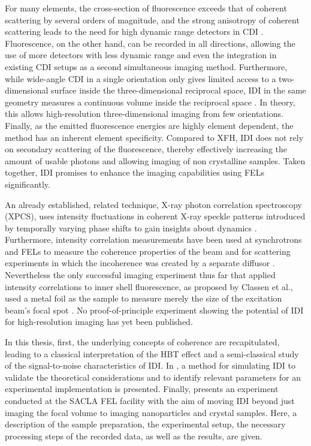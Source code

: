 For many elements, the cross-section of fluorescence exceeds that of coherent scattering by several orders of magnitude, and the strong anisotropy of coherent scattering leads to the need for high dynamic range detectors in CDI \cite{xraylib,attwood1999}.  Fluorescence, on the other hand, can be recorded in all directions, allowing the use of more detectors with less dynamic range and even the integration in existing CDI setups as a second simultaneous imaging method. Furthermore, while wide-angle CDI in a single orientation only gives limited access to a two-dimensional surface inside the three-dimensional reciprocal space, IDI in the same geometry measures a continuous volume inside the reciprocal space \cite{barke2015,classen2017}. In theory, this allows high-resolution three-dimensional imaging from few orientations. Finally, as the emitted fluorescence energies are highly element dependent, the method has an inherent element specificity. Compared to XFH, IDI does not rely on secondary scattering of the fluorescence, thereby effectively increasing the amount of usable photons and allowing imaging of non crystalline samples. Taken together, IDI promises to enhance the imaging capabilities using FELs significantly. 

An already established, related technique, X-ray photon correlation spectroscopy (XPCS), uses intensity fluctuations in coherent X-ray speckle patterns introduced by temporally varying phase shifts to gain insights about dynamics \cite{lehmkuhler2021,grubel2007}. Furthermore, intensity correlation measurements have been used at synchrotrons and FELs to measure the coherence properties of the beam and for scattering experiments in which the incoherence was created by a separate diffusor \cite{yabashi2002,singer2013,inoue2019,gorobtsov2018,schneider2018}.  Nevertheless the only successful imaging experiment thus far that applied intensity correlations to inner shell fluorescence, as proposed by Classen et al., used a metal foil as the sample to measure merely the size of the excitation beam's focal spot \cite{nakumura2020}. No proof-of-principle experiment showing the potential of IDI for high-resolution imaging has yet been published. 

In this thesis, first, the underlying concepts of coherence are recapitulated, leading to a classical interpretation of the HBT effect and a semi-classical study of the signal-to-noise characteristics of IDI. In , a method for simulating IDI to validate the theoretical considerations and to identify relevant parameters for an experimental implementation is presented.  Finally,  presents an experiment conducted at the SACLA FEL facility with the aim of moving IDI beyond just imaging the focal volume to imaging nanoparticles and crystal samples. Here, a description of the sample preparation, the experimental setup, the necessary processing steps of the recorded data, as well as the results, are given.


